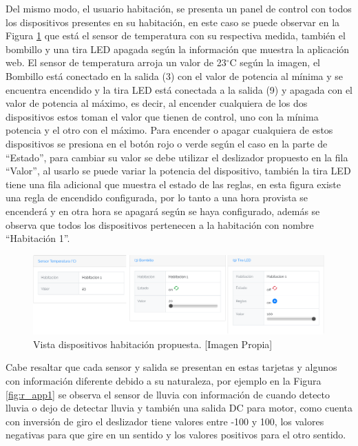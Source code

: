 Del mismo modo, el usuario habitación, se presenta un panel de control con todos los dispositivos presentes en su habitación, en este caso se puede observar en la Figura \ref{fig:r_app} que está el sensor de temperatura con su respectiva medida, también el bombillo y una tira LED apagada según la información que muestra la aplicación web. El sensor de temperatura arroja un valor de 23$^{\circ}$C según la imagen, el Bombillo está conectado en la salida (3) con el valor de potencia al mínima y se encuentra encendido y la tira LED está conectada a la salida (9) y apagada con el valor de potencia al máximo, es decir, al encender cualquiera de los dos dispositivos estos toman el valor que tienen de control, uno con la mínima potencia y el otro con el máximo. Para encender o apagar cualquiera de estos dispositivos se presiona en el botón rojo o verde según el caso en la parte de ``Estado'', para cambiar su valor se debe utilizar el deslizador propuesto en la fila ``Valor'', al usarlo se puede variar la potencia del dispositivo, también la tira LED tiene una fila adicional que muestra el estado de las reglas, en esta figura existe una regla de encendido configurada, por lo tanto a una hora provista se encenderá y en otra hora se apagará según se haya configurado, además se observa que todos los dispositivos pertenecen a la habitación con nombre ``Habitación 1''.\\

\begin{figure}[!t]
	\centering
	\caption[Vista dispositivos habitación propuesta.]{Vista dispositivos habitación propuesta. [Imagen Propia]}
	\label{fig:r_app}
	\includegraphics[width=\linewidth]{Imagenes/R_app}
\end{figure}

Cabe resaltar que cada sensor y salida se presentan en estas tarjetas y algunos con información diferente debido a su naturaleza, por ejemplo en la Figura \ref{fig:r_app1} se observa el sensor de lluvia con información de cuando detecto lluvia o dejo de detectar lluvia y también una salida DC para motor, como cuenta con inversión de giro el deslizador tiene valores entre -100 y 100, los valores negativas para que gire en un sentido y los valores positivos para el otro sentido.\\

